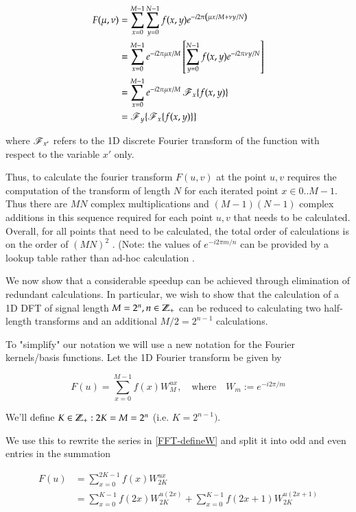 	\begin{align}
	F(\mu,\nu) &= \sum_{x=0}^{M-1} \sum_{y=0}^{N-1} f(x,y) e^{-i2\pi \left(\mu x/M + \nu y/N\right)} \\
  &= \sum_{x=0}^{M-1} e^{-i2\pi \mu x/M} \left[ \sum_{y=0}^{N-1} f(x,y)e^{-i2\pi \nu y/N} \right] \\
  &= \sum_{x=0}^{M-1} e^{-i2\pi \mu x/M} \operatorname{\mathscr{F}}_x\{ f(x,y)\} \\
  &= \operatorname{\mathscr{F}}_y\{\operatorname{\mathscr{F}}_x \{f(x,y)\} \}
	\end{align}
	
	where $\operatorname{\mathscr{F}}_{x'}$ refers to the 1D discrete Fourier transform of the function with respect to
	the variable $x'$ only.
	
	Thus, to calculate the fourier transform $F(u,v)$ at the point $u,v$
	requires the computation of the transform of length $N$ for each iterated point $x \in 0..M-1$. Thus there are $MN$ complex multiplications and $(M-1)(N-1)$ complex additions in this sequence required for each point $u,v$ that needs to be calculated. Overall, for all points that need to be calculated, the total order of calculations is on the order of $(MN)^2$ . (Note: the values of $e^{-i2\pi m/n}$ can be provided by a lookup table rather than ad-hoc calculation .
	
	We now show that a considerable speedup can be achieved through elimination of redundant calculations. In particular, we wish to show that the calculation of a 1D DFT of signal length $M=2^n, n \in \mathbb{Z}_{+}$ can be reduced to calculating two half-length transforms and an additional $M/2 = 2^{n-1}$ calculations.
	
	
	To "simplify" our notation we will use a new notation for the Fourier kernels/basis functions.
	Let the 1D Fourier transform be given by
	
	\begin{equation} \label{FFT-defineW}
	F(u) = \sum_{x=0}^{M-1} f(x) W_M^{ux},\quad \textrm{where} \quad W_m := e^{-i2\pi/m}
	\end{equation} 
	
	We'll define $K \in \mathbb{Z}_{+} : 2K = M = 2^n$ (i.e. $K = 2^{n-1})$.
	
	We use this to rewrite the series in \cref{FFT-defineW} and split it into odd and even entries in the summation
	
	\begin{align}
	F(u) &= \sum_{x=0}^{2K-1} f(x) W_{2K}^{ux} \\
	 &= \sum_{x=0}^{K-1} f(2x) W_{2K}^{u(2x)}
		 + \sum_{x=0}^{K-1} f(2x+1) W_{2K}^{u(2x+1)} \label{FFT-oddevensplit}
	\end{align}
	
